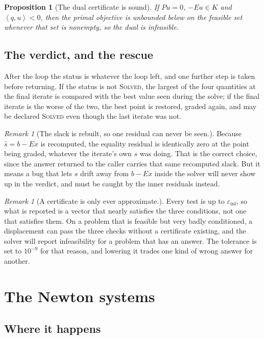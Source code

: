 \documentclass[a4paper,11pt]{book}
\theoremstyle{plain}
\newtheorem{proposition}[theorem]{Proposition}
\theoremstyle{definition}
\theoremstyle{remark}
\newtheorem{remark}[theorem]{Remark}
\numberwithin{equation}{chapter}
\numberwithin{algorithm}{chapter}
\newcommand{\inner}[2]{\left\langle #1, #2 \right\rangle}
\begin{document}
	\begin{proposition}[The dual certificate is sound]
		If $Pu=0$, $-Eu\in K$ and $\inner{q}{u}<0$, then the primal objective is
		unbounded below on the feasible set whenever that set is nonempty, so the
		dual is infeasible.
	\end{proposition}



	\section{The verdict, and the rescue}

	After the loop the status is whatever the loop left, and one further step is
	taken before returning. If the status is not \textsc{Solved}, the largest of
	the four quantities at the final iterate is compared with the best value seen
	during the solve; if the final iterate is the worse of the two, the best point
	is restored, graded again, and may be declared \textsc{Solved} even though the
	last iterate was not.


	\begin{remark}[The slack is rebuilt, so one residual can never be seen.]
	Because $\widehat s=b-Ex$ is recomputed, the equality residual is identically
	zero at the point being graded, whatever the iterate's own $s$ was doing. That
	is the correct choice, since the answer returned to the caller carries that
	same recomputed slack. But it means a bug that lets $s$ drift away from
	$b-Ex$ inside the solver will never show up in the verdict, and must be caught
	by the inner residuals instead.
\end{remark}
	\begin{remark}[A certificate is only ever approximate.]
	Every test is up to $\varepsilon_{\mathrm{inf}}$, so what is reported is a
	vector that nearly satisfies the three conditions, not one that satisfies
	them. On a problem that is feasible but very badly conditioned, a displacement
	can pass the three checks without a certificate existing, and the solver will
	report infeasibility for a problem that has an answer. The tolerance is set to
	$10^{-9}$ for that reason, and lowering it trades one kind of wrong answer for
	another.
\end{remark}

	\chapter{The Newton systems}

	\section{Where it happens}
\end{document}
